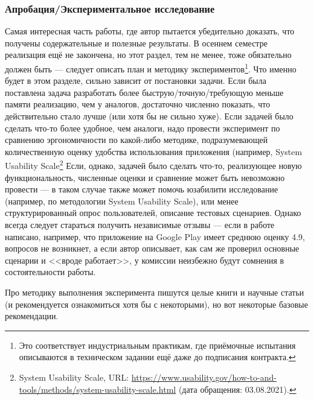 \documentclass{article}
\newcommand{\todo}[1] {
\begin{center}\textcolor{red}{TODO: #1}\end{center}
}
\begin{document}
\subsubsection{Апробация/Экспериментальное исследование}

Самая интересная часть работы, где автор пытается убедительно доказать, что получены содержательные и полезные результаты. В осеннем семестре реализация ещё не закончена, но этот раздел, тем не менее, тоже обязательно должен быть --- следует описать план и методику экспериментов\footnote{Это соответствует индустриальным практикам, где приёмочные испытания описываются в техническом задании ещё даже до подписания контракта.}. Что именно будет в этом разделе, сильно зависит от постановки задачи. Если была поставлена задача разработать более быструю/точную/требующую меньше памяти реализацию, чем у аналогов, достаточно численно показать, что действительно стало лучше (или хотя бы не сильно хуже). Если задачей было сделать что-то более удобное, чем аналоги, надо провести эксперимент по сравнению эргономичности по какой-либо методике, подразумевающей количественную оценку удобства использования приложения (например, System Usability Scale\footnote{System Usability Scale, URL: \url{https://www.usability.gov/how-to-and-tools/methods/system-usability-scale.html} (дата обращения: 03.08.2021).} Если, однако, задачей было сделать что-то, реализующее новую функциональность, численные оценки и сравнение может быть невозможно провести --- в таком случае также может помочь юзабилити исследование (например, по методологии System Usability Scale), или менее структурированный опрос пользователей, описание тестовых сценариев. Однако всегда следует стараться получить независимые отзывы --- если в работе написано, например, что приложение на Google Play имеет среднюю оценку 4.9, вопросов не возникнет, а если автор описывает, как сам же проверил основные сценарии и <<вроде работает>>, у комиссии неизбежно будут сомнения в состоятельности работы.

Про методику выполнения эксперимента пишутся целые книги и научные статьи (и рекомендуется ознакомиться хотя бы с некоторыми), но вот некоторые базовые рекомендации.

\end{document}

